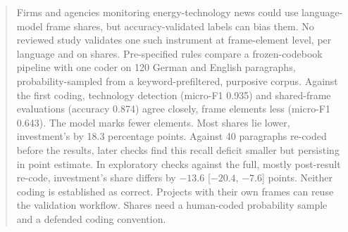 \documentclass[12pt, a4paper]{article}
\theoremstyle{definition}
\begin{document}
\setcounter{page}{2}

\newpage
\begin{abstract}
\noindent
Firms and agencies monitoring energy-technology news could use language-model frame shares, but accuracy-validated labels can bias them. No reviewed study validates one such instrument at frame-element level, per language and on shares. Pre-specified rules compare a frozen-codebook pipeline with one coder on 120 German and English paragraphs, probability-sampled from a keyword-prefiltered, purposive corpus. Against the first coding, technology detection (micro-F1 0.935) and shared-frame evaluations (accuracy 0.874) agree closely, frame elements less (micro-F1 0.643). The model marks fewer elements. Most shares lie lower, investment's by 18.3 percentage points. Against 40 paragraphs re-coded before the results, later checks find this recall deficit smaller but persisting in point estimate. In exploratory checks against the full, mostly post-result re-code, investment's share differs by $-13.6$ [$-20.4$, $-7.6$] points. Neither coding is established as correct. Projects with their own frames can reuse the validation workflow. Shares need a human-coded probability sample and a defended coding convention.
\end{abstract}

\newpage
\makeatletter\renewcommand{\@tocrmarg}{2.55em plus1fil}\makeatother
\tableofcontents

\newpage
{}
\listoffigures

\newpage
{}
\listoftables

\newpage
\end{document}
